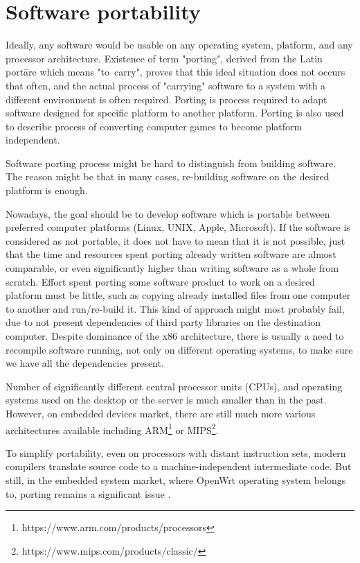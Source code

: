 \chapter{Software portability}\label{porting}

Ideally, any software would be usable on any operating system, platform, and any processor architecture.
Existence of term "porting", derived from the Latin portāre which means "to~carry", proves that this ideal situation does not occurs that often, and the actual process of "carrying" software to a system with a different environment is often required.
Porting is process required to adapt software designed for specific platform to another platform.
Porting is also used to describe process of converting computer games to become platform independent\cite{wiki_porting}.

Software porting process might be hard to distinguish from building software.
The reason might be that in many cases, re-building software on the desired platform is enough.

Nowadays, the goal should be to develop software which is portable between preferred computer platforms (Linux, UNIX, Apple, Microsoft).
If the software is considered as not portable, it does not have to mean that it is not possible, just that the time and resources spent porting already written software are almost comparable, or even significantly higher than writing software as a whole from scratch.
Effort spent porting some software product to work on a desired platform must be little, such as copying already installed files from one computer to another and run/re-build it.
This kind of approach might most probably fail, due to not present dependencies of third party libraries on the destination computer.
Despite dominance of the x86 architecture, there is usually a need to recompile software running, not only on different operating systems, to make sure we have all the dependencies present.

Number of significantly different central processor units (CPUs), and operating systems used on the desktop or the server is much smaller than in the past.
However, on embedded devices market, there are still much more various architectures available including ARM\footnote{https://www.arm.com/products/processors} or MIPS\footnote{https://www.mips.com/products/classic/}.

To simplify portability, even on processors with distant instruction sets, modern compilers translate source code to a machine-independent intermediate code.
But still, in the embedded system market, where OpenWrt operating system belongs to, porting remains a significant issue \cite{porting_software}.



